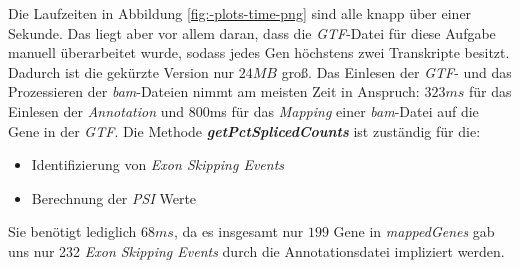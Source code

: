 \documentclass[12pt]{article}
\begin{document}
Die Laufzeiten in Abbildung \ref{fig:-plots-time-png} sind alle knapp über einer Sekunde. Das
liegt aber vor allem daran, dass die \textit{GTF}-Datei für diese Aufgabe manuell überarbeitet wurde,
sodass jedes Gen höchstens zwei Transkripte besitzt. Dadurch ist die gekürzte Version nur
$24MB$ gro\ss . Das Einlesen der \textit{GTF}- und das Prozessieren der \textit{bam}-Dateien
nimmt am meisten Zeit in Anspruch: $323ms$ für das Einlesen der \textit{Annotation} und 800ms 
für das \textit{Mapping} einer \textit{bam}-Datei auf die Gene in der \textit{GTF}.
Die Methode \textit{\textbf{getPctSplicedCounts}} ist zuständig für die: 
\begin{itemize}
    \item Identifizierung von \textit{Exon Skipping Events}
    \item Berechnung der \textit{PSI} Werte
\end{itemize}
Sie benötigt lediglich $68ms$, da es insgesamt nur $199$ Gene in \textit{mappedGenes} gab uns nur 232 \textit{Exon Skipping Events} 
durch die Annotationsdatei impliziert werden.






\newpage
\printbibliography
\end{document}
